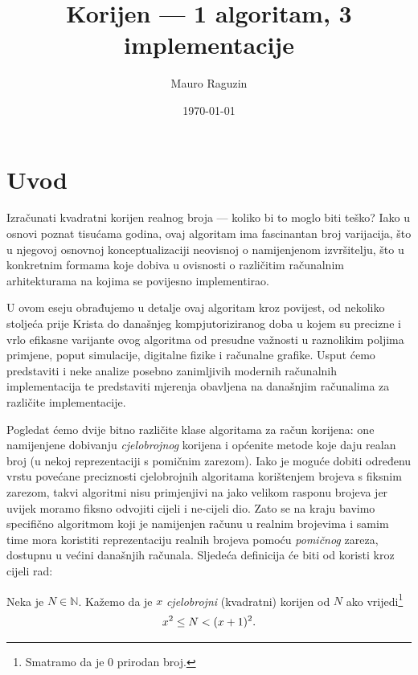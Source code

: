 \documentclass[12pt]{scrartcl}
\title{Korijen --- 1 algoritam, 3 implementacije}
\author{Mauro Raguzin}
\date{\today}
\begin{document}
\maketitle
\tableofcontents
\pagebreak

\section{Uvod}
Izračunati kvadratni korijen realnog broja --- koliko bi to moglo biti teško? Iako u osnovi poznat tisućama godina,
ovaj algoritam ima fascinantan broj varijacija, što u njegovoj osnovnoj konceptualizaciji neovisnoj o namijenjenom izvršitelju, što u konkretnim
formama koje dobiva u ovisnosti o različitim računalnim arhitekturama na kojima se povijesno implementirao.

U ovom eseju obrađujemo u detalje ovaj algoritam kroz povijest, od nekoliko stoljeća prije Krista
do današnjeg kompjutoriziranog doba u kojem su precizne i vrlo efikasne varijante
ovog algoritma od presudne važnosti u raznolikim poljima primjene, poput simulacije, digitalne fizike i računalne grafike. Usput ćemo predstaviti
i neke analize posebno zanimljivih modernih računalnih implementacija te predstaviti mjerenja obavljena na današnjim računalima za različite implementacije.

Pogledat ćemo dvije bitno različite klase algoritama za račun korijena: one namijenjene dobivanju \emph{cjelobrojnog} korijena i općenite
metode koje daju realan broj (u nekoj reprezentaciji s pomičnim zarezom). Iako je moguće dobiti određenu vrstu povećane preciznosti
cjelobrojnih algoritama korištenjem brojeva s fiksnim zarezom, takvi algoritmi nisu primjenjivi na jako velikom rasponu brojeva jer uvijek moramo
fiksno odvojiti cijeli i ne-cijeli dio. Zato se na kraju bavimo specifično algoritmom koji je namijenjen računu u realnim
brojevima i samim time mora koristiti reprezentaciju realnih brojeva pomoću \emph{pomičnog} zareza, dostupnu u većini današnjih računala.
Sljedeća definicija će biti od koristi kroz cijeli rad:
\begin{definicija}
    Neka je $N\in\mathbb{N}$. Kažemo da je $x$ \emph{cjelobrojni} (kvadratni) korijen od $N$ ako vrijedi\footnote{Smatramo da je $0$ prirodan broj.}
    \begin{equation*}
        x^2 \leq N < (x+1)^2\text.
    \end{equation*}
\end{definicija}
\end{document}

